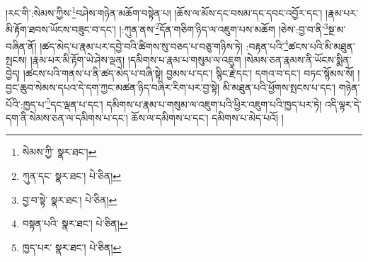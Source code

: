 །རང་གི་:སེམས་ཀྱིས་\footnote{སེམས་ཀྱི་  སྣར་ཐང་། }བཤེས་གཉེན་མཆོག་བསྟེན་པ། །ཆོས་ལ་མོས་དང་བསམ་དང་དབང་འབྱོར་དང་། །རྣམ་པར་མི་རྟོག་ཐབས་ཡོངས་བཟུང་བ་དང་། །:ཀུན་ནས་\footnote{ཀུན་དང་  སྣར་ཐང་།  པེ་ཅིན། }དོན་གཅིག་ཉིད་ལ་འཇུག་པས་མཆོག །ཅེས་:བྱ་བ་ནི་\footnote{བྱ་བ་སྟེ་  སྣར་ཐང་།  པེ་ཅིན། }སྔ་མ་བཞིན་ནོ། །ཚད་མེད་པ་རྣམ་པར་དབྱེ་བའི་ཚིགས་སུ་བཅད་པ་བཅུ་གཉིས་ཏེ། :བརྟན་པའི་\footnote{བསྟན་པའི་  སྣར་ཐང་།  པེ་ཅིན། }ཚངས་པའི་མི་མཐུན་སྤངས། །རྣམ་པར་མི་རྟོག་ཡེ་ཤེས་ལྡན། །དམིགས་པ་རྣམ་པ་གསུམ་ལ་འཇུག །སེམས་ཅན་རྣམས་ནི་ཡོངས་སྨིན་བྱེད། །ཚངས་པའི་གནས་པ་ནི་ཚད་མེད་པ་བཞི་སྟེ། བྱམས་པ་དང་། སྙིང་རྗེ་དང་། དགའ་བ་དང་། བཏང་སྙོམས་སོ། །བྱང་ཆུབ་སེམས་དཔའ་དེ་དག་ཀྱང་མཚན་ཉིད་བཞིར་རིག་པར་བྱ་སྟེ། མི་མཐུན་པའི་ཕྱོགས་སྤངས་པ་དང་། གཉེན་པོའི་:ཁྱད་པ་\footnote{ཁྱད་པར་  སྣར་ཐང་།  པེ་ཅིན། }དང་ལྡན་པ་དང་། དམིགས་པ་རྣམ་པ་གསུམ་ལ་འཇུག་པའི་ཕྱིར་འཇུག་པའི་ཁྱད་པར་ཏེ། འདི་ལྟར་དེ་དག་ནི་སེམས་ཅན་ལ་དམིགས་པ་དང་། ཆོས་ལ་དམིགས་པ་དང་། དམིགས་པ་མེད་པའོ། །
